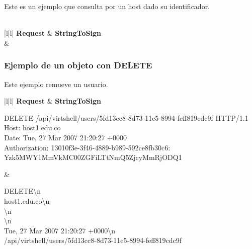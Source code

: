 Este es un ejemplo que consulta por un host dado su identificador. \\
\\
\vspace{1cm}
\scriptsize
\begin{tabular}{|l|l|} \hline
\textbf{Request} & \textbf{StringToSign} \\ \hline
{} & 
 \tabularnewline \hline
\end{tabular}

\subsubsection{Ejemplo de un objeto con DELETE}

Este ejemplo remueve un usuario.
\\
\vspace{1cm}
\scriptsize
\begin{tabular}{|l|l|} \hline
\textbf{Request} & \textbf{StringToSign} \\ \hline
{}%
{\raggedright DELETE /api/virtshell/users/5fd13cc8-8d73-11e5-8994-feff819cdc9f HTTP/1.1 \\
 Host: host1.edu.co \\
 Date: Tue, 27 Mar 2007 21:20:27 +0000 \\
 Authorization: 13010f3e-3f46-4889-b989-592ce8fb30c6: Yzk5MWY1MmVkMC00ZGFiLTtNmQ5ZjcyMmRjODQ1 } & %
{\raggedright DELETE\textbackslash{}n \\
 host1.edu.co\textbackslash{}n \\
 \textbackslash{}n \\
 \textbackslash{}n \\
 Tue, 27 Mar 2007 21:20:27 +0000\textbackslash{}n \\ /api/virtshell/users/5fd13cc8-8d73-11e5-8994-feff819cdc9f} \tabularnewline \hline
\end{tabular}
